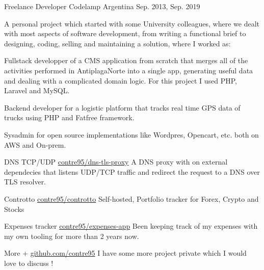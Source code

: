 \hypersetup{colorlinks}
\begin{cventries}

	\cventry
	{Freelance Developer} %
	{Codelamp} %
	{Argentina} %
	{Sep. 2013, Sep. 2019} %
	{
		{A personal project which started with some University colleagues, where we dealt with most aspects of software development, from writing a functional brief to designing, coding, selling and maintaining a solution, where I worked as: }
		\linebreak
		\begin{cvitems}
			\item {Fullstack developper of a CMS application from scratch that merges all of the activities performed in AntiplagaNorte into a single app, generating useful data and dealing with a complicated domain logic. For this project I used PHP, Laravel and MySQL.}
			\item {Backend developer for a logistic platform that tracks real time GPS data of trucks using PHP and Fatfree framework.}
			\item {Sysadmin for open source implementations like Wordpres, Opencart, etc. both on AWS and On-prem.}
		\end{cvitems}
	}


	\cventry
	{DNS TCP/UDP } %
    {}
	{} %
    {\href{https://github.com/contre95/dns-tls-proxy}{\url{contre95/dns-tls-proxy}}}
    {A DNS proxy with on external dependecies that listens UDP/TCP traffic and redirect the request to a DNS over TLS resolver.}

	\cventry
	{Controtto} %
	{} %
	{} %
	{\href{https://github.com/contre95/controtto}{\url{contre95/controtto}}} %
    {Self-hosted, Portfolio tracker for Forex, Crypto and Stocks}

	\cventry
	{Expenses tracker} %
	{} %
	{} %
	{\href{https://github.com/contre95/expenses-app}{\url{contre95/expenses-app}}} %
    {Been keeping track of my expenses with my own tooling for more than 2 years now.}

	\cventry
	{More +} %
	{} %
	{} %
	{\href{http://github.com/contre95}{\url{github.com/contre95}}} %
    {I have some more project private which I would love to discuss !}

\end{cventries}
